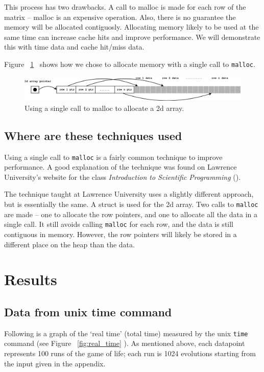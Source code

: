 \documentclass{article}
\begin{document}
This process has two drawbacks. A call to malloc is made for each row of the matrix -- malloc is an expensive operation. Also, there is no guarantee the memory will be allocated contiguosly. Allocating memory likely to be used at the same time can increase cache hits and improve performance. We will demonstrate this with time data and cache hit/miss data. 

Figure ~\ref{fig:mallocPic2} \ shows how we chose to allocate memory with a single call to \verb=malloc=. 

\begin{figure}[htp] 
\centering
\includegraphics[scale=0.40]{malloc2.png}  
\caption{Using a single call to malloc to allocate a 2d array.} 
\label{fig:mallocPic2}
\end{figure} 

\subsection{Where are these techniques used}
Using a single call to \verb=malloc= is a fairly common technique to improve performance. A good explanation of the technique was found on Lawrence University's website for the class \emph{Introduction to Scientific Programming} (\cite{lawrence}). 

The technique taught at Lawrence University uses a slightly different approach, but is essentially the same. A struct is used for the 2d array. Two calls to \verb=malloc= are made -- one to allocate the row pointers, and one to allocate all the data in a single call. It still avoids calling \verb=malloc= for each row, and the data is still contiguous in memory. However, the row pointers will likely be stored in a different place on the heap than the data.   

\section{Results}
\subsection{Data from unix time command} 
Following is a graph of the `real time' (total time) measured by the unix \verb=time= command (see Figure ~\ref{fig:real_time} ). As mentioned above, each datapoint represents 100 runs of the game of life; each run is 1024 evolutions starting from the input given in the appendix. 
\end{document}

